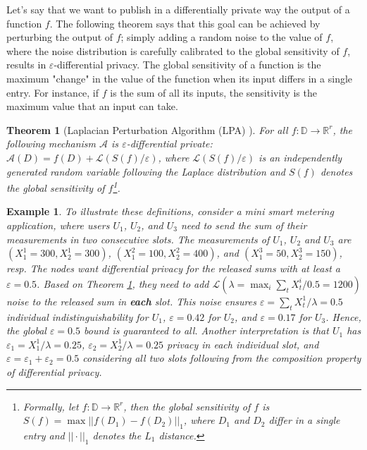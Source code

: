 \documentclass[11pt,a4paper]{article}
\theoremstyle{plain}
\theoremstyle{plain}
\newtheorem{theorem}{Theorem}
\theoremstyle{plain}
\newtheorem{example}{Example}
\theoremstyle{plain}
\theoremstyle{nonumberplain} \theoremseparator{}
\begin{document}
Let's say that we want to publish in a differentially private way the output of a function $f$.
The following theorem says that this goal can be achieved by perturbing the output of $f$; simply adding a random noise to the value of $f$, where the noise distribution is carefully calibrated to the global sensitivity of $f$, results in $\varepsilon$-differential privacy. The global sensitivity of a function is the maximum "change" in the value of the function when its input differs in a single entry. For instance, if $f$ is the sum of all its inputs, the sensitivity is the maximum value that an input can take.


\begin{theorem}[Laplacian Perturbation Algorithm (LPA) \cite{dwork06tcc}]
\label{thm:histo}
For all $f : \mathbb{D} \rightarrow \mathbb{R}^{r}$, the following mechanism $\mathcal{A}$ is $\varepsilon$-differential private: $\mathcal{A}(D)= f(D) + \mathcal{L}(S(f)/\varepsilon)$, where $\mathcal{L}(S(f)/\varepsilon)$ is an independently generated random variable following the Laplace distribution and $S(f)$ denotes the global sensitivity of $f$\footnote{Formally, let $f : \mathbb{D} \rightarrow \mathbb{R}^{r}$, then the global sensitivity of $f$ is $S(f) = \max ||f(D_{1}) - f(D_{2})||_{1}$, where $D_{1}$ and $D_{2}$ differ in a single entry and $|| \cdot ||_{1}$ denotes the $L_{1}$ distance.}.
\end{theorem}





\begin{example}
\label{ex:1}
To illustrate these definitions, consider a mini smart metering application, where users $U_1$, $U_2$, and $U_3$ need to send the sum of their measurements in two consecutive slots. The measurements of $U_1$, $U_2$ and $U_3$ are $(X_{1}^1 = 300, X_{2}^1 = 300)$, $(X_{1}^2 = 100, X_{2}^2 = 400)$, and $(X_{1}^3 = 50, X_{2}^3 = 150)$, resp. The nodes want differential privacy for the released sums with at least a $\varepsilon=0.5$. Based on Theorem \ref{thm:histo}, they need to add $\mathcal{L}(\lambda = \max_i \sum_{t} X_t^i / 0.5 = 1200)$ noise to the released sum in \textbf{each} slot. This noise ensures $\varepsilon = \sum_t X_{t}^1 / \lambda = 0.5$ individual indistinguishability for $U_1$, $\varepsilon = 0.42$ for $U_2$, and $\varepsilon = 0.17$ for $U_3$. Hence, the global $\varepsilon=0.5$ bound is guaranteed to all. Another interpretation is that $U_1$ has $\varepsilon_1 = X_{1}^1 / \lambda =0.25$, $\varepsilon_2=X_{2}^1 / \lambda=0.25$ privacy in each individual slot, and $\varepsilon = \varepsilon_1 + \varepsilon_2=0.5$ considering all two slots following from the composition property of differential privacy.   
\end{example}
\end{document}

